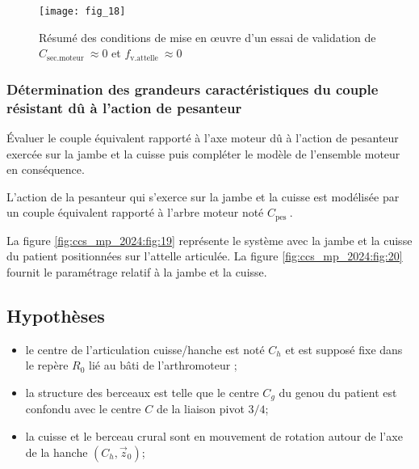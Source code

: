 \begin{figure}[!h]\centering
\texttt{[image: fig\_18]}

\caption{\label{fig:ccs_mp_2024:fig:18}Résumé des conditions de mise en œuvre
d'un essai de validation de $C_{\text {sec.moteur }} \approx 0$ et $f_{\text {v.attelle }} \approx 0$}
\end{figure}




\subsubsection{Détermination des grandeurs caractéristiques du couple résistant dû à l'action de pesanteur}
\begin{obj}
Évaluer le couple équivalent rapporté à l'axe moteur dû à l'action de pesanteur exercée sur la jambe et la cuisse puis compléter le modèle de l'ensemble moteur en conséquence.
\end{obj}
L'action de la pesanteur qui s'exerce sur la jambe et la cuisse est modélisée par un couple équivalent rapporté à l'arbre moteur noté $C_{\text {pes }}$.

La figure \ref{fig:ccs_mp_2024:fig:19} représente le système avec la jambe et la cuisse du patient positionnées sur l'attelle articulée. La figure \ref{fig:ccs_mp_2024:fig:20} fournit le paramétrage relatif à la jambe et la cuisse.

\subsection*{Hypothèses}
\begin{itemize}
  \item le centre de l'articulation cuisse/hanche est noté $C_{h}$ et est supposé fixe dans le repère $R_{0}$ lié au bâti de l'arthromoteur ;

  \item la structure des berceaux est telle que le centre $C_{g}$ du genou du patient est confondu avec le centre $C$ de la liaison pivot $3 / 4$;

  \item la cuisse et le berceau crural sont en mouvement de rotation autour de l'axe de la hanche $\left(C_{h}, \vec{z}_{0}\right)$;

\end{itemize}

